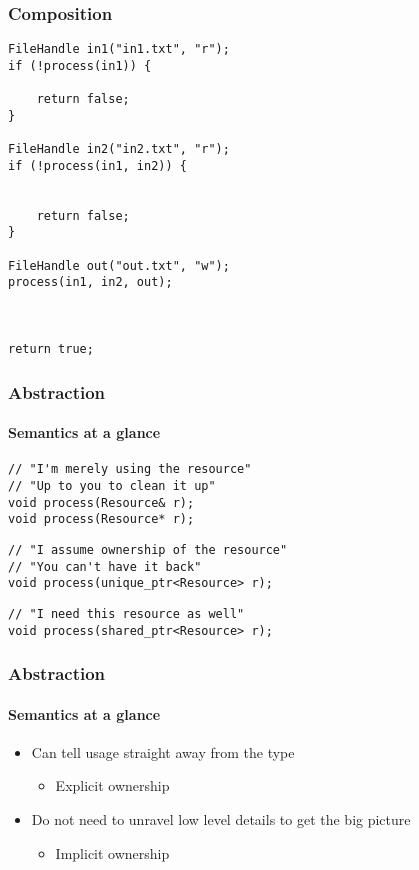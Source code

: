 \begin{frame}[fragile]
    \frametitle{Composition}
    \begin{lstlisting}[basicstyle=\scriptsize\ttfamily\color{codefg},title=With RAII]
FileHandle in1("in1.txt", "r");
if (!process(in1)) {

    return false;
}

FileHandle in2("in2.txt", "r");
if (!process(in1, in2)) {


    return false;
}

FileHandle out("out.txt", "w");
process(in1, in2, out);



return true;
    \end{lstlisting}
\end{frame}

\begin{frame}[fragile]
    \frametitle{Abstraction}
    \framesubtitle{Semantics at a glance}
    \begin{lstlisting}[title=Raw pointer]
// "I'm merely using the resource"
// "Up to you to clean it up"
void process(Resource& r);
void process(Resource* r);
    \end{lstlisting}

    \begin{lstlisting}[title=Unique pointer]
// "I assume ownership of the resource"
// "You can't have it back"
void process(unique_ptr<Resource> r);
    \end{lstlisting}

    \begin{lstlisting}[title=Shared pointer]
// "I need this resource as well"
void process(shared_ptr<Resource> r);
    \end{lstlisting}
\end{frame}

\begin{frame}
    \frametitle{Abstraction}
    \framesubtitle{Semantics at a glance}
    \begin{itemize}
        \item Can tell usage straight away from the type
            \begin{itemize}
                \item Explicit ownership
            \end{itemize}
        \item Do not need to unravel low level details to get the big picture
            \begin{itemize}
                \item Implicit ownership
            \end{itemize}
    \end{itemize}
\end{frame}

